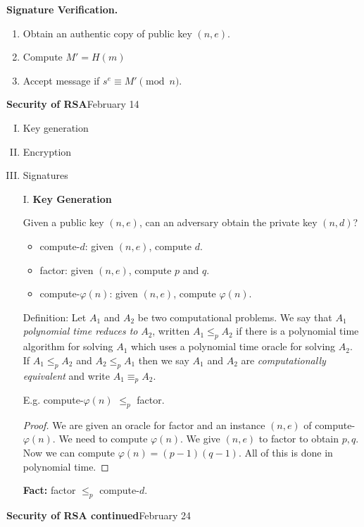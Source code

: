 \documentclass[a4paper,12pt]{article}
\begin{document}
{\bf Signature Verification.}
\begin{enumerate}
\item Obtain an authentic copy of public key $(n,e)$.
\item Compute $M'=H(m)$
\item Accept message if $s^e \equiv M' \pmod n$.
\end{enumerate}

\clearpage
{\bf Security of RSA}\hfill February 14

\begin{enumerate}[I.]
\item
Key generation
\item
Encryption
\item
Signatures
\end{enumerate}

\begin{enumerate}
\item[I.]
{\bf Key Generation}

Given a public key $(n,e)$, can an adversary obtain the private key $(n,d)$?
\begin{itemize}
\item
{\sc compute}-$d$: given $(n,e)$, compute $d$.
\item
{\sc factor}: given $(n,e)$, compute $p$ and $q$.
\item
{\sc compute}-$\varphi(n)$: given $(n,e)$, compute $\varphi(n)$.
\end{itemize}
Definition: Let $A_1$ and $A_2$ be two computational problems.  We say that $A_1$ {\it polynomial time reduces to} $A_2$, written $A_1 \le_p A_2$ if there is a polynomial time algorithm for solving $A_1$ which uses a polynomial time oracle for solving $A_2$.  If $A_1 \le_p A_2$ and $A_2 \le_p A_1$ then we say $A_1$ and $A_2$ are {\it computationally equivalent} and write $A_1 \equiv_p A_2.$

E.g. {\sc compute}-$\varphi(n)$ $\le_p$ {\sc factor}.
\begin{proof}
We are given an oracle for {\sc factor} and an instance $(n,e)$ of {\sc compute}-$\varphi(n)$.  We need to compute $\varphi(n)$.  We give $(n,e)$ to {\sc factor} to obtain $p,q$.  Now we can compute $\varphi(n)=(p-1)(q-1)$.  All of this is done in polynomial time.
\end{proof}
{\bf Fact:} {\sc factor} $\le_p$ {\sc compute}-$d$.
\end{enumerate}

\clearpage
{\bf Security of RSA continued}\hfill February 24
\end{document}
